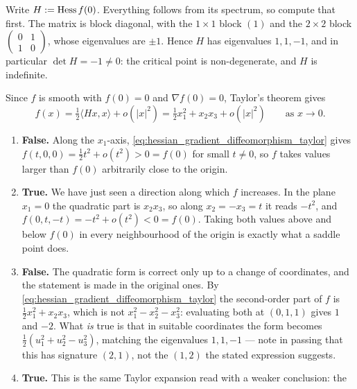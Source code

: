 \begin{exercisesolution}
\label{sol:hessian_gradient_diffeomorphism}
Write $H := \operatorname{Hess} f(0)$. Everything follows from its spectrum, so compute that first. The matrix is
block diagonal, with the $1\times1$ block $(1)$ and the $2\times2$ block
$\left(\begin{smallmatrix} 0 & 1 \\ 1 & 0\end{smallmatrix}\right)$, whose eigenvalues are $\pm 1$.
Hence $H$ has eigenvalues $1, 1, -1$, and in particular $\det H = -1 \neq 0$: the critical point is
non-degenerate, and $H$ is indefinite.

Since $f$ is smooth with $f(0) = 0$ and $\nabla f(0) = 0$, Taylor's theorem gives
\begin{equation}
\label{eq:hessian_gradient_diffeomorphism_taylor}
f(x) = \tfrac12 \langle Hx, x\rangle + o(\lvert x\rvert^2)
     = \tfrac12 x_1^2 + x_2x_3 + o(\lvert x\rvert^2)
     \qquad \text{as } x \to 0 .
\end{equation}
\begin{enumerate}[label=\textbf{(\alph*)}]
  \item \textbf{False.} Along the $x_1$-axis, \eqref{eq:hessian_gradient_diffeomorphism_taylor} gives
    $f(t,0,0) = \tfrac12 t^2 + o(t^2) > 0 = f(0)$ for small $t \neq 0$, so $f$ takes values larger
    than $f(0)$ arbitrarily close to the origin.
  \item \textbf{True.} We have just seen a direction along which $f$ increases. In the plane
    $x_1 = 0$ the quadratic part is $x_2x_3$, so along $x_2 = -x_3 = t$ it reads $-t^2$, and
    $f(0,t,-t) = -t^2 + o(t^2) < 0 = f(0)$. Taking both values above and below $f(0)$ in every
    neighbourhood of the origin is exactly what a saddle point does.
  \item \textbf{False.} The quadratic form is correct only up to a change of coordinates, and the
    statement is made in the original ones. By \eqref{eq:hessian_gradient_diffeomorphism_taylor} the second-order
    part of $f$ is $\tfrac12 x_1^2 + x_2 x_3$, which is not $x_1^2 - x_2^2 - x_3^2$: evaluating both
    at $(0,1,1)$ gives $1$ and $-2$. What \emph{is} true is that in suitable coordinates the form
    becomes $\tfrac12(u_1^2 + u_2^2 - u_3^2)$, matching the eigenvalues $1,1,-1$ --- note in
    passing that this has signature $(2,1)$, not the $(1,2)$ the stated expression suggests.
  \item \textbf{True.} This is the same Taylor expansion read with a weaker conclusion: the

\end{enumerate}
\end{exercisesolution}

